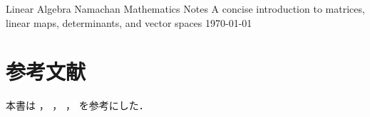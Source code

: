\documentclass{mathnote}
\begin{document}
\tituloum
  {Linear Algebra}
  {Namachan}
  {Mathematics Notes}
  {A concise introduction to matrices, linear maps, determinants, and vector spaces}
  {\today}

%

\cleardoublepage
{}
\pagecolor{white}

\localtableofcontents






\newpage
{}

\part*{参考文献}

\noindent
本書は
\cite{saitomasahiko1966}，
\cite{arai}，
\cite{yukiegunron}，
\cite{fujioka2021}
を参考にした．

\medskip

\printbibliography[heading=none]
\clearpage
\thispagestyle{empty}
\setcounter{section}{6}
\renewcommand{\indexname}{索引}

\begingroup
  \let\section\part
  \pagestyle{empty}
  \printindex
\endgroup

\end{document}
